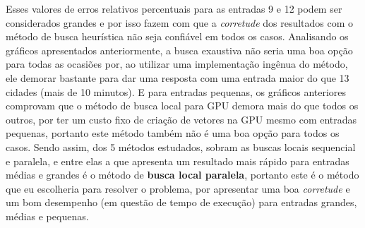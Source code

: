 \documentclass[11pt]{article}
\begin{document}
    Esses valores de erros relativos percentuais para as entradas 9 e 12
podem ser considerados grandes e por isso fazem com que a
\emph{corretude} dos resultados com o método de busca heurística não
seja confiável em todos os casos. Analisando os gráficos apresentados
anteriormente, a busca exaustiva não seria uma boa opção para todas as
ocasiões por, ao utilizar uma implementação ingênua do método, ele
demorar bastante para dar uma resposta com uma entrada maior do que 13
cidades (mais de 10 minutos). E para entradas pequenas, os gráficos
anteriores comprovam que o método de busca local para GPU demora mais do
que todos os outros, por ter um custo fixo de criação de vetores na GPU
mesmo com entradas pequenas, portanto este método também não é uma boa
opção para todos os casos. Sendo assim, dos 5 métodos estudados, sobram
as buscas locais sequencial e paralela, e entre elas a que apresenta um
resultado mais rápido para entradas médias e grandes é o método de
\textbf{busca local paralela}, portanto este é o método que eu
escolheria para resolver o problema, por apresentar uma boa
\emph{corretude} e um bom desempenho (em questão de tempo de execução)
para entradas grandes, médias e pequenas.
\end{document}
